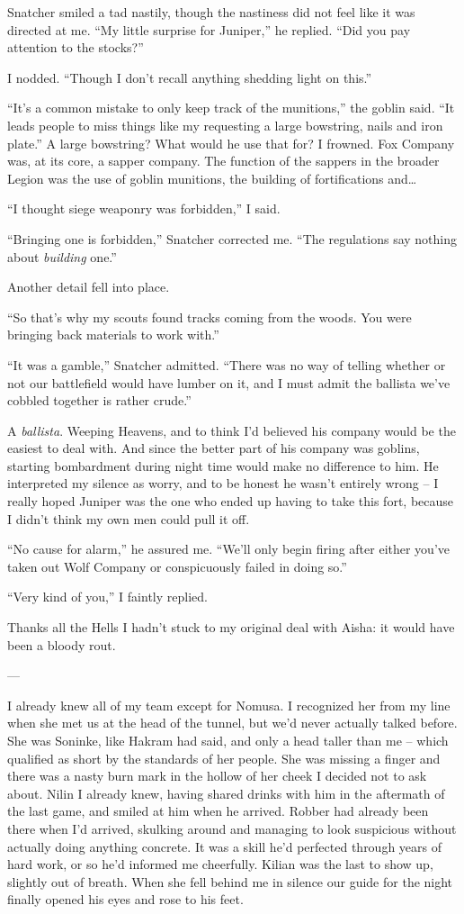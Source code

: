 \documentclass[12pt, openany]{book}
\begin{document}
Snatcher smiled a tad nastily, though the nastiness did not feel like it was directed at me.
“My little surprise for Juniper,” he replied. “Did you pay attention to the stocks?”

I nodded. “Though I don’t recall anything shedding light on this.”

“It’s a common mistake to only keep track of the munitions,” the goblin said. “It leads people to miss things like my requesting a large bowstring, nails and iron plate.”
A large bowstring? What would he use that for? I frowned. Fox Company was, at its core, a sapper company. The function of the sappers in the broader Legion was the use of goblin munitions, the building of fortifications and…

“I thought siege weaponry was forbidden,” I said.

“Bringing one is forbidden,” Snatcher corrected me. “The regulations say nothing about \textit{building} one.”

Another detail fell into place.

“So that’s why my scouts found tracks coming from the woods. You were bringing back materials to work with.”

“It was a gamble,” Snatcher admitted. “There was no way of telling whether or not our battlefield would have lumber on it, and I must admit the ballista we’ve cobbled together is rather crude.”

A \textit{ballista}. Weeping Heavens, and to think I’d believed his company would be the easiest to deal with. And since the better part of his company was goblins, starting bombardment during night time would make no difference to him. He interpreted my silence as worry, and to be honest he wasn’t entirely wrong – I really hoped Juniper was the one who ended up having to take this fort, because I didn’t think my own men could pull it off.

“No cause for alarm,” he assured me. “We’ll only begin firing after either you’ve taken out Wolf Company or conspicuously failed in doing so.”

“Very kind of you,” I faintly replied.

Thanks all the Hells I hadn’t stuck to my original deal with Aisha: it would have been a bloody rout.

—

I already knew all of my team except for Nomusa.
I recognized her from my line when she met us at the head of the tunnel, but we’d never actually talked before. She was Soninke, like Hakram had said, and only a head taller than me – which qualified as short by the standards of her people. She was missing a finger and there was a nasty burn mark in the hollow of her cheek I decided not to ask about. Nilin I already knew, having shared drinks with him in the aftermath of the last game, and smiled at him when he arrived. Robber had already been there when I’d arrived, skulking around and managing to look suspicious without actually doing anything concrete. It was a skill he’d perfected through years of hard work, or so he’d informed me cheerfully. Kilian was the last to show up, slightly out of breath. When she fell behind me in silence our guide for the night finally opened his eyes and rose to his feet.
\end{document}
